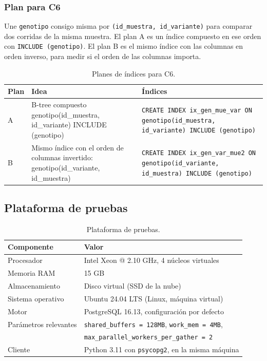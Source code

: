 \subsubsection{Plan para C6}

Une \texttt{genotipo} consigo misma por \texttt{(id\_\allowbreak{}muestra, id\_\allowbreak{}variante)} para comparar dos corridas de la misma muestra. El plan A es un índice compuesto en ese orden con \texttt{INCLUDE (genotipo)}. El plan B es el mismo índice con las columnas en orden inverso, para medir si el orden de las columnas importa.

\begin{table}[H]
\centering\footnotesize
\begin{tabular}{@{}>{\raggedright\arraybackslash}p{0.8cm}>{\raggedright\arraybackslash}p{3.9cm}>{\raggedright\arraybackslash}p{9.4cm}@{}}
\toprule
Plan & Idea & Índices \\
\midrule
A & B-tree compuesto genotipo(id\_muestra, id\_variante) INCLUDE (genotipo) & \texttt{CREATE INDEX ix\_\allowbreak{}gen\_\allowbreak{}mue\_\allowbreak{}var ON genotipo(id\_\allowbreak{}muestra, id\_\allowbreak{}variante) INCLUDE (genotipo)} \\
B & Mismo índice con el orden de columnas invertido: genotipo(id\_variante, id\_muestra) & \texttt{CREATE INDEX ix\_\allowbreak{}gen\_\allowbreak{}var\_\allowbreak{}mue2 ON genotipo(id\_\allowbreak{}variante, id\_\allowbreak{}muestra) INCLUDE (genotipo)} \\
\bottomrule
\end{tabular}
\caption{Planes de índices para C6.}
\end{table}

\subsection{Plataforma de pruebas}

\begin{table}[H]
\centering\small
\begin{tabular}{@{}ll@{}}
\toprule
Componente & Valor \\
\midrule
Procesador & Intel Xeon @ 2.10 GHz, 4 núcleos virtuales \\
Memoria RAM & 15 GB \\
Almacenamiento & Disco virtual (SSD de la nube) \\
Sistema operativo & Ubuntu 24.04 LTS (Linux, máquina virtual) \\
Motor & PostgreSQL 16.13, configuración por defecto \\
Parámetros relevantes & \texttt{shared\_\allowbreak{}buffers = 128MB}, \texttt{work\_\allowbreak{}mem = 4MB}, \\
 & \texttt{max\_\allowbreak{}parallel\_\allowbreak{}workers\_\allowbreak{}per\_\allowbreak{}gather = 2} \\
Cliente & Python 3.11 con \texttt{psycopg2}, en la misma máquina \\
\bottomrule
\end{tabular}
\caption{Plataforma de pruebas.}
\end{table}

